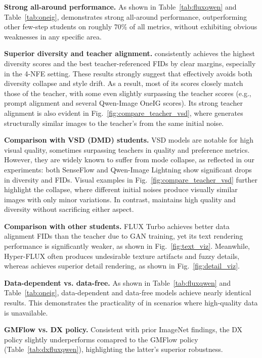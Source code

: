 \textbf{Strong all-around performance.}
As shown in Table~\ref{tab:fluxqwen} and Table~\ref{tab:oneig}, \methodname{} demonstrates strong all-around performance, outperforming other few-step students on roughly 70\% of all metrics, without exhibiting obvious weaknesses in any specific area. 

\textbf{Superior diversity and teacher alignment.}
\methodname{} consistently achieves the highest diversity scores and the best teacher-referenced FIDs by clear margins, especially in the 4-NFE setting. 
These results strongly suggest that \methodname{} effectively avoids both diversity collapse and style drift. As a result, most of its scores closely match those of the teacher, with some even slightly surpassing the teacher scores (e.g., prompt alignment and several Qwen-Image OneIG scores). Its strong teacher alignment is also evident in Fig.~\ref{fig:compare_teacher_vsd}, where \methodname{} generates structurally similar images to the teacher's from the same initial noise.

\textbf{Comparison with VSD (DMD) students.} 
VSD models are notable for high visual quality, sometimes surpassing teachers in quality and preference metrics. However, they are widely known to suffer from mode collapse, as reflected in our experiments: both SenseFlow and Qwen-Image Lightning show significant drops in diversity and FIDs. Visual examples in Fig.~\ref{fig:compare_teacher_vsd} further highlight the collapse, where different initial noises produce visually similar 
images with only minor variations. 
In contrast, \methodname{} maintains high quality and diversity without sacrificing either aspect.


\textbf{Comparison with other students.}
FLUX Turbo achieves better data alignment FIDs than the teacher due to GAN training, yet its text rendering performance is significantly weaker, as shown in Fig.~\ref{fig:text_viz}.
Meanwhile, Hyper-FLUX often produces undesirable texture artifacts and fuzzy details, whereas \methodname{} achieves superior detail rendering, as shown in Fig.~\ref{fig:detail_viz}.

\textbf{Data-dependent vs. data-free.}
As shown in Table~\ref{tab:fluxqwen} and Table~\ref{tab:oneig}, data-dependent and data-free \methodname{} models achieve nearly identical results. This demonstrates the practicality of \methodname{} in scenarios where high-quality data is unavailable.

\textbf{GMFlow vs. DX policy.}
Consistent with prior ImageNet findings, the DX policy slightly underperforms comapred to the GMFlow policy (Table~\ref{tab:dxfluxqwen}), highlighting the latter's superior robustness.

